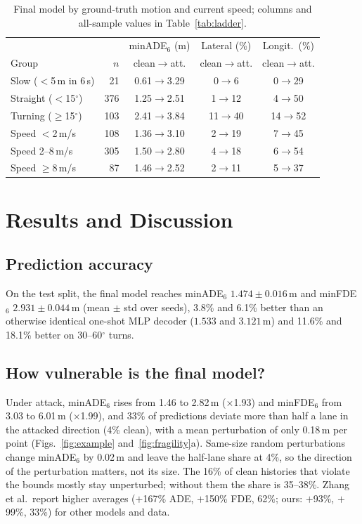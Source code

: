 \documentclass[conference]{IEEEtran}
\newcommand{\minade}{minADE$_6$}
\newcommand{\minfde}{minFDE$_6$}
\begin{document}
\begin{table}[t]
\centering
\caption{Final model by ground-truth motion and current speed; columns and all-sample values in Table~\ref{tab:ladder}.}
\label{tab:strata}
\footnotesize
\setlength{\tabcolsep}{3pt}
\begin{tabular}{@{}lrccc@{}}
\toprule
& & \minade{} (m) & Lateral (\%) & Longit.\ (\%) \\
Group & $n$ & clean$\to$att. & clean$\to$att. & clean$\to$att. \\
\midrule
Slow ($<$5\,m in 6\,s) & 21 & 0.61$\to$3.29 & \phantom{0}0$\to$\phantom{0}6 & \phantom{0}0$\to$29 \\
Straight ($<$15$^\circ$) & 376 & 1.25$\to$2.51 & \phantom{0}1$\to$12 & \phantom{0}4$\to$50 \\
Turning ($\ge$15$^\circ$) & 103 & 2.41$\to$3.84 & 11$\to$40 & 14$\to$52 \\
\midrule
Speed $<$2\,m/s & 108 & 1.36$\to$3.10 & \phantom{0}2$\to$19 & \phantom{0}7$\to$45 \\
Speed 2--8\,m/s & 305 & 1.50$\to$2.80 & \phantom{0}4$\to$18 & \phantom{0}6$\to$54 \\
Speed $\ge$8\,m/s & 87 & 1.46$\to$2.52 & \phantom{0}2$\to$11 & \phantom{0}5$\to$37 \\
\bottomrule
\end{tabular}
\end{table}

\section{Results and Discussion}
\subsection{Prediction accuracy}\label{sec:accuracy}
On the test split, the final model reaches \minade{} $1.474\pm0.016$\,m and \minfde{} $2.931\pm0.044$\,m (mean $\pm$ std over seeds), 3.8\% and 6.1\% better than an otherwise identical one-shot MLP decoder ($1.533$ and $3.121$\,m) and 11.6\% and 18.1\% better on 30--60$^\circ$ turns.

\subsection{How vulnerable is the final model?}\label{sec:vulnerable}
Under attack, \minade{} rises from 1.46 to 2.82\,m ($\times$1.93) and \minfde{} from 3.03 to 6.01\,m ($\times$1.99), and 33\% of predictions deviate more than half a lane in the attacked direction (4\% clean), with a mean perturbation of only 0.18\,m per point (Figs.~\ref{fig:example} and~\ref{fig:fragility}a). Same-size random perturbations change \minade{} by 0.02\,m and leave the half-lane share at 4\%, so the direction of the perturbation matters, not its size. The 16\% of clean histories that violate the bounds mostly stay unperturbed; without them the share is 35--38\%. Zhang et al.\ report higher averages ($+$167\% ADE, $+$150\% FDE, 62\%; ours: $+$93\%, $+$99\%, 33\%) for other models and data.
\end{document}

